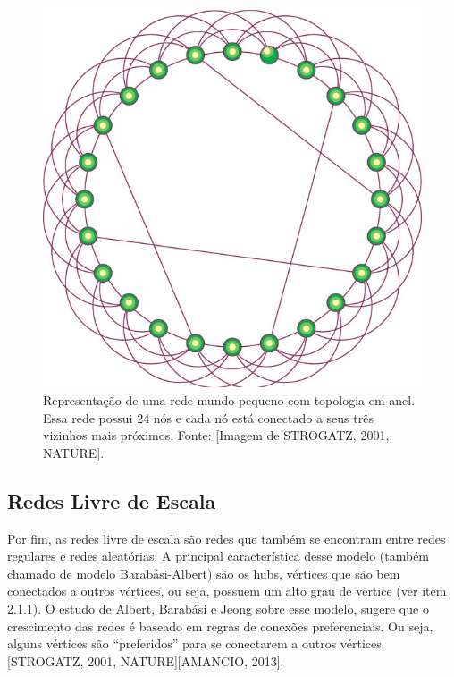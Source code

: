 \documentclass[xindy,rascunho]{fei}
\begin{document}
\begin{figure}
\centering
\includegraphics[width=0.7\linewidth]{./Imagens_Monografia/410268ad2(Small-world_Strongatz_2001).jpg}
\caption{Representação de uma rede mundo-pequeno com topologia em anel. Essa rede possui 24 nós e cada nó está conectado a seus três vizinhos mais próximos. 
Fonte: [Imagem de STROGATZ, 2001, NATURE].}
\label{fig:RedeMundoPequeno}
\end{figure}

\subsection{Redes Livre de Escala}

Por fim, as redes livre de escala são redes que também se encontram entre redes regulares e redes aleatórias. A principal característica desse modelo (também chamado de modelo Barabási-Albert) são os hubs, vértices que são bem conectados a outros vértices, ou seja, possuem um alto grau de vértice (ver item 2.1.1). O estudo de Albert, Barabási e Jeong sobre esse modelo, sugere que o crescimento das redes é baseado em regras de conexões preferenciais. Ou seja, alguns vértices são “preferidos” para se conectarem a outros vértices [STROGATZ, 2001, NATURE][AMANCIO, 2013].
\end{document}
